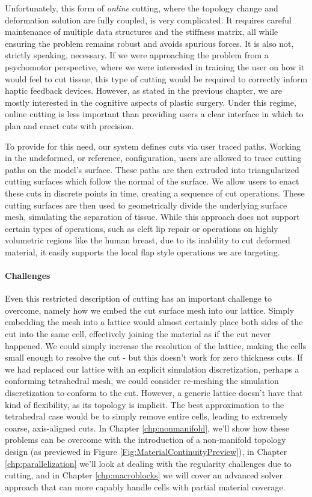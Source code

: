   Unfortunately, this form of \textit{online} cutting, where the
  topology change and deformation solution are fully coupled, is very
  complicated. It requires careful maintenance of multiple data
  structures and the stiffness matrix, all while ensuring the problem
  remains robust and avoids spurious forces. It is also not, strictly
  speaking, necessary. If we were approaching the problem from a
  psychomotor perspective, where we were interested in training the
  user on how it would feel to cut tissue, this type of cutting would
  be required to correctly inform haptic feedback devices. However, as
  stated in the previous chapter, we are mostly interested in the
  cognitive aspects of plastic surgery. Under this regime, online
  cutting is less important than providing users a clear interface in
  which to plan and enact cuts with precision. 

  To provide for this need, our system defines cuts via user traced
  paths. Working in the undeformed, or reference, configuration, users
  are allowed to trace cutting paths on the model's surface. These
  paths are then extruded into triangularized cutting surfaces which
  follow the normal of the surface. We allow users to enact these cuts
  in discrete points in time, creating a sequence of cut
  operations. These cutting surfaces are then used to geometrically
  divide the underlying surface mesh, simulating the separation of
  tissue. While this approach does not support certain types of
  operations, such as cleft lip repair or operations on highly
  volumetric regions like the human breast, due to its inability to
  cut deformed material, it easily supports the local flap style
  operations we are targeting.

  \paragraph{Challenges} Even this restricted description of
  cutting has an important challenge to overcome, namely how we embed
  the cut surface mesh into our lattice. Simply embedding the mesh
  into a lattice would almost certainly place both sides of the cut
  into the same cell, effectively joining the material as if the cut
  never happened. We could simply increase the resolution of the
  lattice, making the cells small enough to resolve the cut - but this
  doesn't work for zero thickness cuts. If we had replaced our lattice
  with an explicit simulation discretization, perhaps a conforming
  tetrahedral mesh, we could consider re-meshing the simulation
  discretization to conform to the cut. However, a generic lattice
  doesn't have that kind of flexibility, as its topology is
  implicit. The best approximation to the tetrahedral case would be to
  simply remove entire cells, leading to extremely coarse,
  axis-aligned cuts. In Chapter \ref{chp:nonmanifold}, we'll show how
  these problems can be overcome with the introduction of a
  non-manifold topology design (as previewed in Figure
  \ref{Fig:MaterialContinuityPreview}), in Chapter
  \ref{chp:parallelization} we'll look at dealing with the regularity
  challenges due to cutting, and in Chapter
  \ref{chp:macroblocks} we will cover an advanced solver approach that
  can more capably handle cells with partial material coverage.

